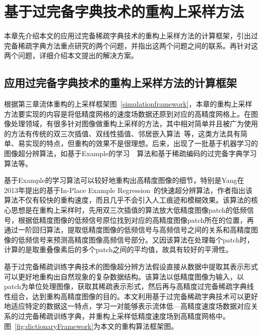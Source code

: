 
\chapter{基于过完备字典技术的重构上采样方法}
\label{chap:faq}

本章先介绍本文的应用过完备稀疏字典技术的重构上采样方法的计算框架，引出过完备稀疏字典方法重点研究的两个问题，并指出这两个问题之间的联系。再针对这两个问题，详细介绍本文提出的解决方案。

\section{应用过完备字典技术的重构上采样方法的计算框架}

根据第三章流体重构的上采样框架图~\ref{simulationframework}，本章的重构上采样方法要实现的内容是将低精度网格的速度场数据还原到对应的高精度网格上。在图像处理领域，有很多针对图像做重构上采样的方法，其中相对简单并且被广为使用的方法有传统的双三次插值、双线性插值、邻居嵌入算法~\cite{chang2004super}等，这类方法具有简单、易实现的特点，但重构的效果不是很理想。后来，出现了一批基于机器学习的图像超分辨算法，如基于Example的学习~\cite{freeman2002example}~\cite{kim2008example}算法和基于稀疏编码的过完备字典学习算法等。

基于Example的学习算法可以较好地重构出高精度图像的细节，特别是Yang在2013年提出的基于In-Place Example Regression~\cite{yang2013fast}的快速超分辨算法，作者指出该算法不仅有较快的重构速度，而且几乎不会引入人工痕迹和模糊效果。该算法的核心思想是在重构上采样时，先用双三次插值的算法放大低精度图像patch的低频信号，根据低精度图像的低频信号原位找到对应的高精度图像patch所在的位置，再通过一阶回归算法，提取低精度图像的低频信号与高频信号之间的关系和高精度图像的低频信号来预测高精度图像高频信号部分。又因该算法在处理每个patch时，计算的是取重叠像素后的多个patch之间的平均值，故具有较好的平滑性。

基于过完备稀疏训练字典技术的图像超分辨方法假设直接从数据中提取其表示形式可以更好地重构出自然现象的复杂数据结构。该算法以低精度图像为输入，以patch为单位处理图像，获取其稀疏表示形式，然后再与高精度过完备稀疏字典线性组合，达到重构高精度图像的目的。本文利用基于过完备稀疏字典技术可以更好地适应特定的数据这一特点，学习一对能够表示流体低—高精度速度场数据对应关系的过完备稀疏训练字典，并重构上采样低精度速度场到高精度网格中。图~\ref{fig:dictionaryFramework}为本文的重构算法框架图。


